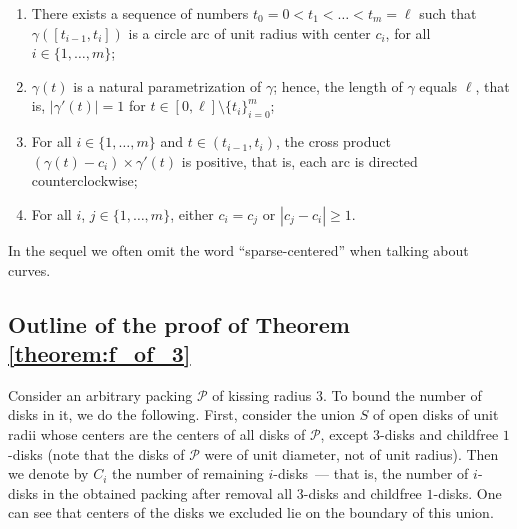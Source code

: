 \begin{enumerate}[label=(\alph*)]
  \item There exists a sequence of numbers $t_0 = 0 < t_1 < \ldots < t_m=\ell$ such that $\gamma([t_{i-1}, t_i])$ is a circle arc of unit radius with center $c_i$, for all $i\in\{1, \ldots, m\}$;
  \item $\gamma(t)$ is a natural parametrization of $\gamma$; hence, the length of $\gamma$ equals $\ell$, that is, $|\gamma'(t)| = 1$ for $t\in[0, \ell]\setminus\{t_i\}_{i=0}^m$;
  \item For all $i\in\{1, \ldots, m\}$ and $t\in(t_{i-1}, t_i)$, the cross product $(\gamma(t) - c_i)\times \gamma'(t)$ is positive, that is, each arc is directed counterclockwise;
  \item For all $i$, $j\in\{1, \ldots, m\}$, either $c_i = c_j$ or $|c_j - c_i|\geq 1$.
\end{enumerate}

In the sequel we often omit the word ``sparse-centered'' when talking about curves.

\subsection{Outline of the proof of Theorem \ref{theorem:f_of_3}}

Consider an arbitrary packing $\mathcal{P}$ of kissing radius $3$. To bound the number of disks in it, we do the following. First, consider the union $S$ of open disks of unit radii whose centers are the centers of all disks of $\mathcal{P}$, except $3$-disks and childfree $1$-disks (note that the disks of $\mathcal{P}$ were of unit diameter, not of unit radius).
Then we denote by $C_i$ the number of remaining $i$-disks~--- that is, the number of $i$-disks in the obtained packing after removal all $3$-disks and childfree $1$-disks.
One can see that centers of the disks we excluded lie on the boundary of this union.


